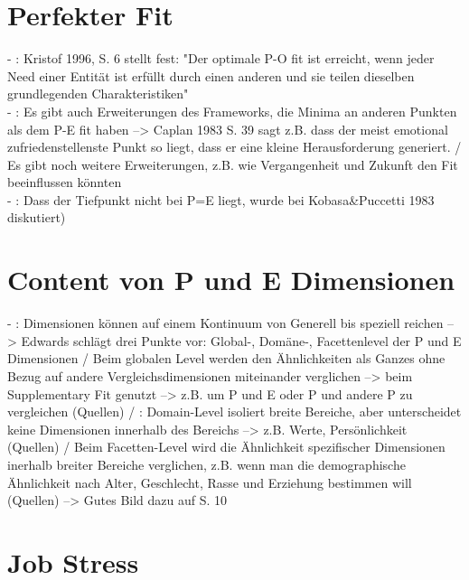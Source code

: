 \section{Perfekter Fit}
\label{ch:personEnvironmentFit:perfekterFit}
- \cite[S. 4]{edwards:2004}: Kristof 1996, S. 6 stellt fest: "Der optimale P-O fit ist erreicht, wenn jeder Need einer Entität ist erfüllt durch einen anderen und sie teilen dieselben grundlegenden Charakteristiken" \\
- \cite[S. 23]{edwards:2008}: Es gibt auch Erweiterungen des Frameworks, die Minima an anderen Punkten als dem P-E fit haben --> Caplan 1983 S. 39 sagt z.B. dass der meist emotional zufriedenstellenste Punkt so liegt, dass er eine kleine Herausforderung generiert. / Es gibt noch weitere Erweiterungen, z.B. wie Vergangenheit und Zukunft den Fit beeinflussen könnten \\
- \cite[S. 6]{caplan:1987}: Dass der Tiefpunkt nicht bei P=E liegt, wurde bei Kobasa\&Puccetti 1983 diskutiert)

\section{Content von P und E Dimensionen}
\label{ch:notizen:contentVonPundEDimensionen}
- \cite[S. 6]{edwards:2007}: Dimensionen können auf einem Kontinuum von Generell bis speziell reichen --> Edwards schlägt drei Punkte vor: Global-, Domäne-, Facettenlevel der P und E Dimensionen / Beim globalen Level werden den Ähnlichkeiten als Ganzes ohne Bezug auf andere Vergleichsdimensionen miteinander verglichen --> beim Supplementary Fit genutzt --> z.B. um P und E oder P und andere P zu vergleichen (Quellen) / \cite[S. 7]{edwards:2007}: Domain-Level  isoliert breite Bereiche, aber unterscheidet keine Dimensionen innerhalb des Bereichs --> z.B. Werte, Persönlichkeit (Quellen) / Beim Facetten-Level wird die Ähnlichkeit spezifischer Dimensionen inerhalb breiter Bereiche verglichen, z.B. wenn man die demographische Ähnlichkeit nach Alter, Geschlecht, Rasse und Erziehung bestimmen will (Quellen) --> Gutes Bild dazu auf S. 10 \\

\section{Job Stress}
\label{ch:notizen:jobStress}
